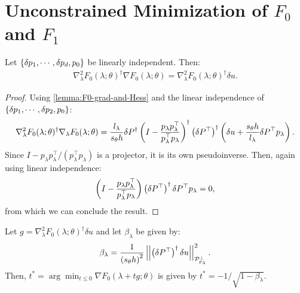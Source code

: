 \documentclass[eikonal.tex]{subfiles}
\begin{document}
\section{Unconstrained Minimization of $F_0$ and $F_1$}

\begin{lemma}
  Let $\left\{\delta p_1, \cdots, \delta p_d, p_0\right\}$ be linearly
  independent. Then:
  \begin{align*}
    \nabla_\lambda^2 F_0(\lambda; \theta)^\dagger \nabla F_0(\lambda; \theta) = \nabla_\lambda^2 F_0(\lambda; \theta)^\dagger \delta u.
  \end{align*}
\end{lemma}

\begin{proof}
  Using \cref{lemma:F0-grad-and-Hess} and the linear independence
  of $\left\{\delta p_1, \cdots, \delta p_2, p_0\right\}$:
  \begin{align*}
    \nabla^2_\lambda F_0(\lambda; \theta)^\dagger \nabla_\lambda F_0(\lambda; \theta) = \frac{l_\lambda}{s_\theta h} \delta P^\dagger \left(I - \frac{p_\lambda p_\lambda^\top}{p_\lambda^\top p_\lambda}\right)^\dagger \left(\delta P^{\top}\right)^\dagger \left(\delta u + \frac{s_\theta h}{l_\lambda} \delta P^\top p_\lambda\right).
  \end{align*}
  Since $I - p_\lambda p_\lambda^\top/(p_\lambda^\top p_\lambda)$ is a
  projector, it is its own pseudoinverse. Then, again using linear
  independence:
  \begin{align*}
    \left(I - \frac{p_\lambda p_\lambda^\top}{p_\lambda^\top p_\lambda}\right) \left(\delta P^{\top}\right)^\dagger \delta P^\top p_\lambda = 0,
  \end{align*}
  from which we can conclude the result.
\end{proof}

\begin{lemma}
  Let $g = \nabla^2_\lambda F_0(\lambda; \theta)^\dagger \delta u$ and
  let $\beta_\lambda$ be given by:
  \begin{align*}
    \beta_\lambda = \frac{1}{\left(s_\theta h\right)^2} \left|\left|\left(\delta P^\top\right)^\dagger \delta u\right|\right|^2_{\mathcal{P}^\perp_{p_\lambda}}.
  \end{align*}
  Then, $t^* = \arg\min_{t \leq 0} \nabla F_0(\lambda + t g; \theta)$
  is given by $t^* = -1/\sqrt{1 - \beta_\lambda}$.
\end{lemma}
\end{document}
